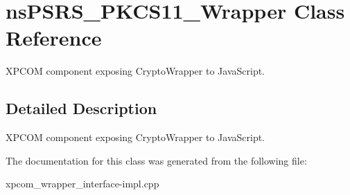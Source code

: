 \hypertarget{classnsPSRS__PKCS11__Wrapper}{
\section{nsPSRS\_\-PKCS11\_\-Wrapper Class Reference}
\label{classnsPSRS__PKCS11__Wrapper}
}


XPCOM component exposing CryptoWrapper to JavaScript.  


\subsection{Detailed Description}
XPCOM component exposing CryptoWrapper to JavaScript. 

The documentation for this class was generated from the following file:\begin{DoxyCompactItemize}
\item 
xpcom\_\-wrapper\_\-interface-\/impl.cpp\end{DoxyCompactItemize}
